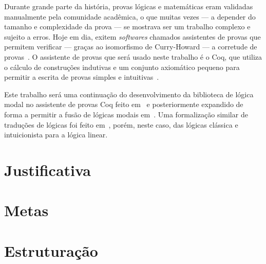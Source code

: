 Durante grande parte da história, provas lógicas e matemáticas eram validadas manualmente pela comunidade acadêmica, o que muitas vezes --- a depender do tamanho e complexidade da prova --- se mostrava ser um trabalho complexo e sujeito a erros. Hoje em dia, exitem \textit{softwares} chamados assistentes de provas que permitem verificar --- graças ao isomorfismo de Curry-Howard --- a corretude de provas~\citep{Chlipala}. O assistente de provas que será usado neste trabalho é o Coq, que utiliza o cálculo de construções indutivas e um conjunto axiomático pequeno para permitir a escrita de provas simples e intuitivas~\cite{Barras}.

Este trabalho será uma continuação do desenvolvimento da biblioteca de lógica modal no assistente de provas Coq feito em~\cite{Silveira} e posteriormente expandido de forma a permitir a fusão de lógicas modais em~\cite*{Nunes}. Uma formalização similar de traduções de lógicas foi feito em~\cite{Sehnem}, porém, neste caso, das lógicas clássica e intuicionista para a lógica linear.

    \section{Justificativa}
    \section{Metas}
    \section{Estruturação}